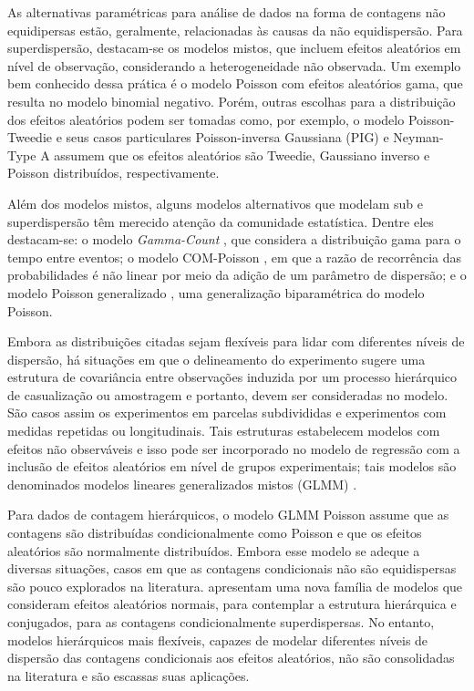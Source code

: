 \documentclass[
    oldfontcommands,
    11pt,
    openright,
    twoside,
    a4paper,
    english,
    brazil
]{abntex2}\usepackage[]{graphicx}\usepackage[]{color}
\begin{document}
As alternativas paramétricas para análise de dados na forma de contagens
não equidipersas estão, geralmente, relacionadas às causas da não
equidispersão. Para superdispersão, destacam-se os modelos mistos, que
incluem efeitos aleatórios em nível de observação, considerando a
heterogeneidade não observada. Um exemplo bem conhecido dessa prática é
o modelo Poisson com efeitos aleatórios gama, que resulta no modelo
binomial negativo. Porém, outras escolhas para a distribuição dos
efeitos aleatórios podem ser tomadas como, por exemplo, o modelo
Poisson-Tweedie \citep{Bonat2018} e seus casos particulares
Poisson-inversa Gaussiana (PIG) e Neyman-Type A assumem que os efeitos
aleatórios são Tweedie, Gaussiano inverso e Poisson distribuídos,
respectivamente.

Além dos modelos mistos, alguns modelos alternativos que modelam sub e
superdispersão têm merecido atenção da comunidade estatística. Dentre
eles destacam-se: o modelo \textit{Gamma-Count} \citep{Winkelmann1995,
  Zeviani2014}, que considera a distribuição gama para o tempo entre
eventos; o modelo COM-Poisson \citep{Shmueli2005, Sellers2010}, em que a
razão de recorrência das probabilidades é não linear por meio da adição
de um parâmetro de dispersão; e o modelo Poisson generalizado
\citep{Consul1992, Zamani2012}, uma generalização biparamétrica do
modelo Poisson.

Embora as distribuições citadas sejam flexíveis para lidar com
diferentes níveis de dispersão, há situações em que o delineamento do
experimento sugere uma estrutura de covariância entre observações
induzida por um processo hierárquico de casualização ou amostragem e
portanto, devem ser consideradas no modelo. São casos assim os
experimentos em parcelas subdivididas e experimentos com medidas
repetidas ou longitudinais.  Tais estruturas estabelecem modelos com
efeitos não observáveis e isso pode ser incorporado no modelo de
regressão com a inclusão de efeitos aleatórios em nível de grupos
experimentais; tais modelos são denominados modelos lineares
generalizados mistos (GLMM) \citep{Molenberghs2005}.

Para dados de contagem hierárquicos, o modelo GLMM Poisson assume que as
contagens são distribuídas condicionalmente como Poisson e que os
efeitos aleatórios são normalmente distribuídos. Embora esse modelo se
adeque a diversas situações, casos em que as contagens condicionais não
são equidispersas são pouco explorados na
literatura. \citet{Molenberghs2007, Molenberghs2010, Molenberghs2017}
apresentam uma nova família de modelos que consideram efeitos aleatórios
normais, para contemplar a estrutura hierárquica e conjugados, para
as contagens condicionalmente superdispersas. No entanto, modelos
hierárquicos mais flexíveis, capazes de modelar diferentes níveis de
dispersão das contagens condicionais aos efeitos aleatórios, não são
consolidadas na literatura e são escassas suas aplicações.
\end{document}
